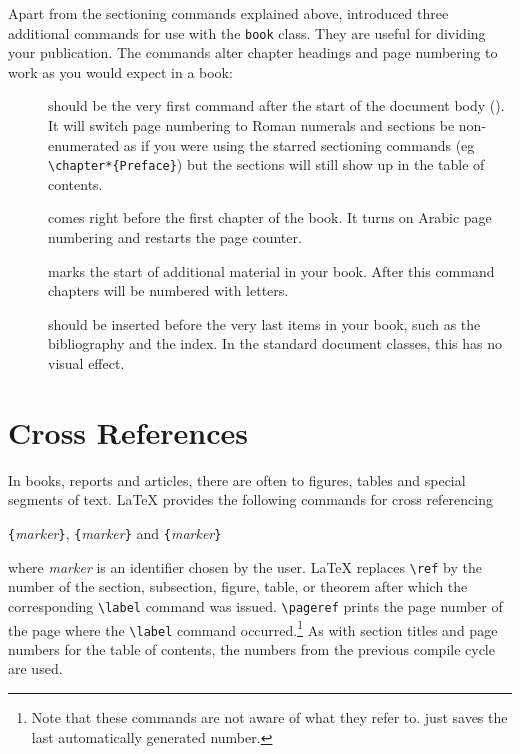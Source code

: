 Apart from the sectioning commands explained above, \LaTeXe{}
introduced three additional commands for use with the \verb|book| class. 
They are useful for dividing your publication. The commands alter
chapter headings and page numbering to work as you would expect in
a book:
\begin{description}
\item[] should be the very first command after
  the start of the document body (\verb||). It will switch page numbering to Roman
    numerals and sections be non-enumerated as if you were using 
    the starred sectioning commands (eg \verb|\chapter*{Preface}|)
    but the sections will still show up in the table of contents.
\item[] comes right before the first chapter of
  the book. It turns on Arabic page numbering and restarts the page
  counter.
\item[] marks the start of additional material in your
  book. After this command chapters will be numbered with letters.
\item[] should be inserted before the very last items
  in your book, such as the bibliography and the index. In the standard
  document classes, this has no visual effect.
\end{description}


\section{Cross References}

In books, reports and articles, there are often 
 to figures, tables and special segments of text.
\LaTeX{} provides the following commands for cross referencing
\begin{lscommand}
\verb|{|\emph{marker}\verb|}|, \verb|{|\emph{marker}\verb|}| 
and \verb|{|\emph{marker}\verb|}|
\end{lscommand}
\noindent where \emph{marker} is an identifier chosen by the user. \LaTeX{}
replaces \verb|\ref| by the number of the section, subsection, figure,
table, or theorem after which the corresponding \verb|\label| command
was issued. \verb|\pageref| prints the page number of the
page where the \verb|\label| command occurred.\footnote{Note that these commands
  are not aware of what they refer to.  just saves the last
  automatically generated number.} As with section titles and page numbers for the table of contents,
the numbers from the previous compile cycle are used.


